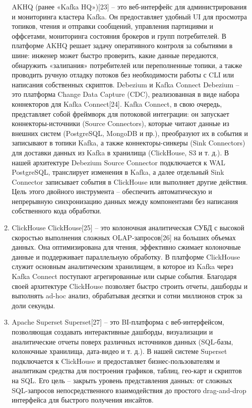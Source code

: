 \begin{enumerate}[1.]
	      AKHQ (ранее «Kafka HQ»)[23] – это веб-интерфейс для администрирования и мониторинга кластера Kafka. Он предоставляет удобный UI для просмотра топиков, чтения и отправки сообщений, управления партициями и оффсетами, мониторинга состояния брокеров и групп потребителей. В платформе AKHQ решает задачу оперативного контроля за событиями в шине: инженер может быстро проверить, какие данные передаются, обнаружить «залипания» потребителей или переполненные топики, а также проводить ручную отладку потоков без необходимости работы с CLI или написания собственных скриптов.
	      Debezium и Kafka Connect
	      Debezium – это платформа Change Data Capture (CDC), реализованная в виде набора коннекторов для Kafka Connect[24]. Kafka Connect, в свою очередь, представляет собой фреймворк для потоковой интеграции: он запускает коннекторы-источники (Source Connectors), которые читают данные из внешних систем (PostgreSQL, MongoDB и пр.), преобразуют их в события и записывают в топики Kafka, а также коннекторы-синкеры (Sink Connectors) для доставки данных из Kafka в хранилища (ClickHouse, S3 и т. д.). В нашей архитектуре Debezium Source Connector подключается к WAL PostgreSQL, транслирует изменения в Kafka, а далее отдельный Sink Connector записывает события в ClickHouse или выполняет другие действия. Цель этого двойного инструмента – обеспечить автоматическую и непрерывную синхронизацию данных между компонентами без написания собственного кода обработки.
	\item ClickHouse
	      ClickHouse[25] – это колоночная аналитическая СУБД с высокой скоростью выполнения сложных OLAP-запросов[26] на больших объемах данных. Она оптимизирована для чтения, эффективно сжимает колоночные данные и поддерживает параллельную обработку. В платформе ClickHouse служит основным аналитическим хранилищем, в которое из Kafka через Kafka Connect поступают агрегированные или сырые события. Благодаря своей архитектуре ClickHouse позволяет быстро строить отчеты, дашборды и выполнять ad-hoc анализ, обрабатывая десятки и сотни миллионов строк за доли секунды.
	\item Apache Superset
	      Superset[27] – это BI-платформа с веб-интерфейсом, позволяющая создавать интерактивные дашборды, визуализации и аналитические отчеты поверх различных источников данных (SQL-базы, колоночные хранилища, дата-видео и т. д.). В нашей системе Superset подключается к ClickHouse и предоставляет бизнес-пользователям и аналитикам средства для построения графиков, таблиц, гео-карт и скриптов на SQL. Его цель – закрыть уровень представления данных: от сложных SQL-запросов непосредственного взаимодействия до простого drag-and-drop интерфейса для быстрого получения инсайтов.
\end{enumerate}


